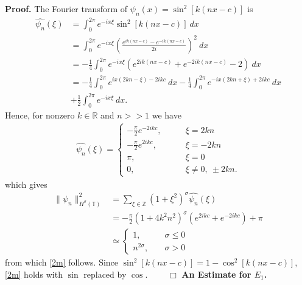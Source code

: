\documentclass[12pt,reqno]{amsart}
\newcommand{\rr}{\mathbb{R}}
\newcommand{\zz}{\mathbb{Z}}
\newcommand{\ci}{\mathbb{T}}
\theoremstyle{plain}  %
\theoremstyle{definition}
\begin{document}
		{\bf Proof.} The Fourier transform of $\psi_n(x) = \sin^2[k(nx-c)]$
		is
		\begin{equation*}
			\begin{split}
				\widehat{\psi_n}(\xi) 
				& = \int_0^{2\pi} e^{-ix \xi} \sin^2[k(nx-c)] \ dx
				\\
				& = \int_0^{2\pi} e^{-ix \xi} \left( \frac{e^{ik(nx-c)} -
				e^{-ik(nx-c)}}{2i} \right)^2 \ dx
				\\
				& = -\frac{1}{4} \int_0^{2\pi} e^{-ix \xi} (e^{2ik(nx-c)} +
				e^{-2ik(nx-c)} -2) \ dx
				\\
				& = -\frac{1}{4} \int_0^{2\pi} e^{ix(2kn - \xi) - 2ikc} \
				dx - \frac{1}{4} \int_0^{2\pi} e^{-ix(2kn + \xi) + 2ikc} \ dx
				\\
				& + \frac{1}{2} \int_0^{2\pi} e^{-ix \xi} \ dx.
			\end{split}
		\end{equation*}
	Hence, for nonzero $k \in \rr$ and $n >>1$ we have
	\begin{equation*}
		\begin{split}
			\widehat{\psi_n}(\xi) = 
			\begin{cases}
				-\frac{\pi}{2}e^{-2ikc}, \qquad & \xi=2kn
				\\
				-\frac{\pi}{2}e^{2ikc}, \qquad & \xi = -2kn
				\\
				\pi, \qquad & \xi = 0
				\\
				0, \qquad & \xi \neq 0, \ \pm 2kn.
			\end{cases}
		\end{split}
	\end{equation*}
	which gives
	\begin{equation*}
		\begin{split}
			\|\psi_n\|_{H^\sigma(\ci)}^2 
			& = \sum_{\xi \in \zz} (1+ \xi^2)^\sigma \widehat{\psi_n}(\xi)
			\\
			& = -\frac{\pi}{2}(1+4k^2n^2)^\sigma (e^{2ikc} + e^{-2ikc}) +
			\pi
			\\
			& \simeq 
			\begin{cases}
				1,  \qquad & \sigma \le 0 
				\\
				n^{2 \sigma}, &  \sigma > 0
			\end{cases}
		\end{split}
	\end{equation*}
	from which \eqref{2m} follows. Since $\sin^2[k(nx-c)] = 1-
	\cos^2[k(nx-c)]$, \eqref{2m} holds with $\sin$ replaced by
	$\cos$. $\qquad \Box$
	\vskip0.1in
	{\bf An Estimate for $\hyperref[90*]{E_1}$.}
\end{document}
